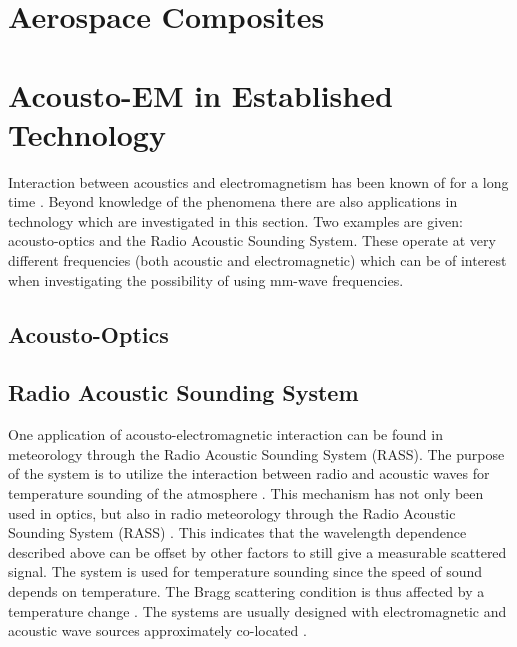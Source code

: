 \documentclass[11pt,twoside]{eitExjobb}
\begin{document}
	\section{Aerospace Composites}
	
	\section{Acousto-EM in Established Technology}
	Interaction between acoustics and electromagnetism has been known of for a long time \addref. Beyond knowledge of the phenomena there are also applications in technology which are investigated in this section. Two examples are given: acousto-optics and the Radio Acoustic Sounding System. These operate at very different frequencies (both acoustic and electromagnetic) which can be of interest when investigating the possibility of using mm-wave frequencies.
	
	\subsection{Acousto-Optics}
	
	\subsection{Radio Acoustic Sounding System}
	One application of acousto-electromagnetic interaction can be found in meteorology through the Radio Acoustic Sounding System (RASS). The purpose of the system is to utilize the interaction between radio and acoustic waves for temperature sounding of the atmosphere .
	This mechanism has not only been used in optics, but also in radio meteorology through the Radio Acoustic Sounding System (RASS) \cite{Buerkle2007}. This indicates that the wavelength dependence described above can be offset by other factors to still give a measurable scattered signal. The system is used for temperature sounding since the speed of sound depends on temperature. The Bragg scattering condition is thus affected by a temperature change \cite{Marshall1972}. The systems are usually designed with electromagnetic and acoustic wave sources approximately co-located \cite{Marshall1972}.
	
\end{document}
